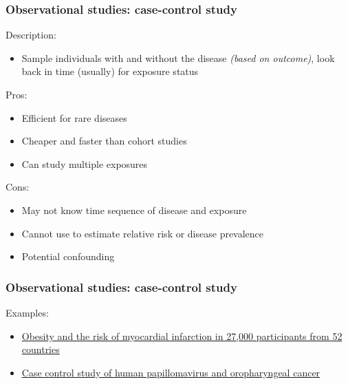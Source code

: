 \documentclass[12pt, 
hyperref={colorlinks=true, linkcolor=blue, urlcolor=cyan}]{beamer}
\begin{document}
\begin{frame}
\frametitle{Observational studies: case-control study}
Description: \vspace{-0.3cm}
\begin{itemize}
\item Sample individuals with and without the disease \textit{(based on outcome)}, look back in time (usually) for exposure status %
\end{itemize}

Pros:\vspace{-0.3cm}
\begin{itemize}
\item Efficient for rare diseases %
\item Cheaper and faster than cohort studies
\item Can study multiple exposures
\end{itemize}

Cons:\vspace{-0.3cm}
\begin{itemize}
\item May not know time sequence of disease and exposure
\item Cannot use to estimate relative risk or disease prevalence
\item Potential confounding
\end{itemize}
\end{frame}

\begin{frame}
\frametitle{Observational studies: case-control study}
Examples:
\begin{itemize}
\item \href{https://www.sciencedirect.com/science/article/pii/S0140673605676635}{Obesity and the risk of myocardial infarction in 27,000 participants from 52 countries}
\item \href{http://www.nejm.org/doi/full/10.1056/NEJMoa065497\#t=article}{Case control study of human papillomavirus and oropharyngeal cancer}
\end{itemize}
\end{frame}
\end{document}
